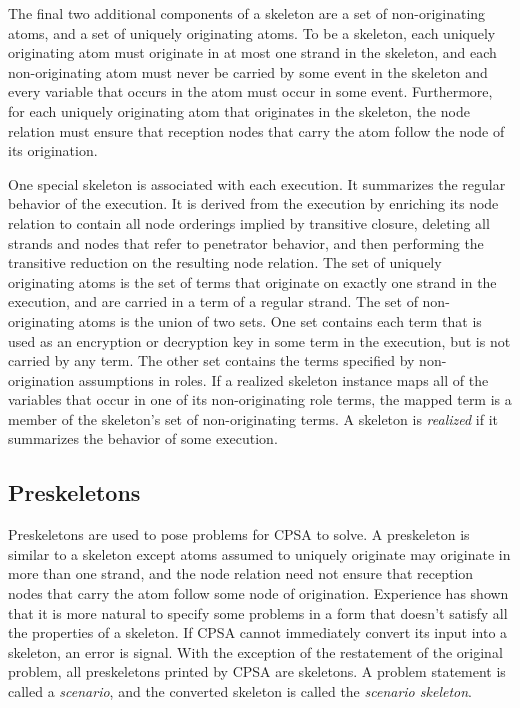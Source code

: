 \documentclass[12pt]{article}
\begin{document}
The final two additional components of a skeleton are a set of
non-originating atoms, and a set of uniquely originating atoms.  To be
a skeleton, each uniquely originating atom must originate in at
most one strand in the skeleton, and each non-originating atom must
never be carried by some event in the skeleton and every
variable that occurs in the atom must occur in some event.
Furthermore, for each uniquely originating atom that originates in the
skeleton, the node relation must ensure that reception nodes that
carry the atom follow the node of its origination.

One special skeleton is associated with each execution.  It summarizes
the regular behavior of the execution.  It is derived from the
execution by enriching its node relation to contain all node orderings
implied by transitive closure, deleting all strands and nodes that
refer to penetrator behavior, and then performing the transitive
reduction on the resulting node relation.  The set of uniquely
originating atoms is the set of terms that originate on exactly one
strand in the execution, and are carried in a term of a regular
strand.  The set of non-originating atoms is the union of two sets.
One set contains each term that is used as an encryption or decryption
key in some term in the execution, but is not carried by any term.
The other set contains the terms specified by non-origination
assumptions in roles.  If a realized skeleton instance maps all of the
variables that occur in one of its non-originating role terms, the
mapped term is a member of the skeleton's set of non-originating
terms.  A skeleton is \emph{realized} if it summarizes the behavior of
some execution.

\subsection{Preskeletons}

Preskeletons are used to pose problems for CPSA to solve.  A
preskeleton is similar to a skeleton except atoms assumed to uniquely
originate may originate in more than one strand, and the node relation
need not ensure that reception nodes that carry the atom follow some
node of origination.  Experience has shown that it is more natural to
specify some problems in a form that doesn't satisfy all the
properties of a skeleton.  If CPSA cannot immediately convert its
input into a skeleton, an error is signal.  With the exception of the
restatement of the original problem, all preskeletons printed by CPSA
are skeletons.  A problem statement is called a \emph{scenario}, and
the converted skeleton is called the \emph{scenario skeleton}.
\end{document}
